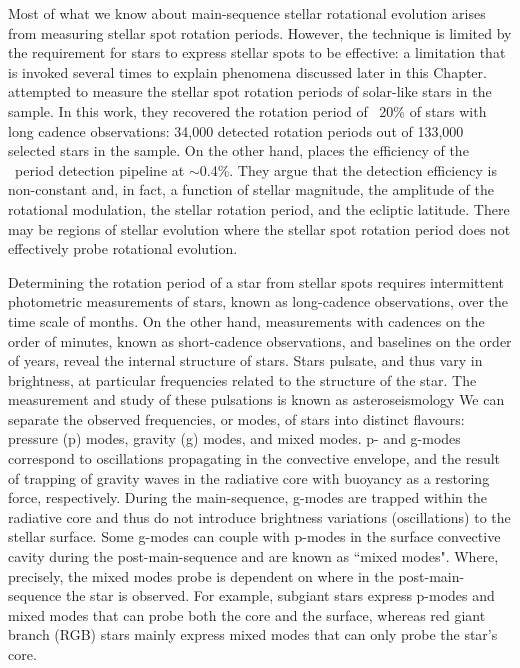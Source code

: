 Most of what we know about main-sequence stellar rotational evolution arises from measuring stellar spot rotation periods.
However, the technique is limited by the requirement for stars to express stellar spots to be effective: a limitation that is invoked several times to explain phenomena discussed later in this Chapter. 
\citet{mcquillan_rotation_2014} attempted to measure the stellar spot rotation periods of solar-like stars in the \kepler{} sample.
In this work, they recovered the rotation period of ~20\% of stars with long cadence observations: 34,000 detected rotation periods out of 133,000 selected stars in the sample.
On the other hand, \citet{distefano_gaia_2022} places the efficiency of the \GDRT\ period detection pipeline at $\sim$0.4\%.
They argue that the detection efficiency is non-constant and, in fact, a function of stellar magnitude, the amplitude of the rotational modulation, the stellar rotation period, and the ecliptic latitude.
There may be regions of stellar evolution where the stellar spot rotation period does not effectively probe rotational evolution.

Determining the rotation period of a star from stellar spots requires intermittent photometric measurements of stars, known as long-cadence observations, over the time scale of months. 
On the other hand, measurements with cadences on the order of minutes, known as short-cadence observations, and baselines on the order of years, reveal the internal structure of stars.
Stars pulsate, and thus vary in brightness, at particular frequencies related to the structure of the star. 
The measurement and study of these pulsations is known as asteroseismology \citep[see, e.g.,][for thorough overviews]{christensen-dalsgaard_interpretation_1982,christensen-dalsgaard_comparison_1990, aerts_asteroseismology_2010, basu_asteroseismic_2017}
We can separate the observed frequencies, or modes, of stars into distinct flavours: pressure (p) modes, gravity (g) modes, and mixed modes.
p- and g-modes correspond to oscillations propagating in the convective envelope, and the result of trapping of gravity waves in the radiative core with buoyancy as a restoring force, respectively. 
During the main-sequence, g-modes are trapped within the radiative core and thus do not introduce brightness variations (oscillations) to the stellar surface.
Some g-modes can couple with p-modes in the surface convective cavity during the post-main-sequence and are known as ``mixed modes".
Where, precisely, the mixed modes probe is dependent on where in the post-main-sequence the star is observed.
For example, subgiant stars express p-modes and mixed modes that can probe both the core and the surface, whereas red giant branch (RGB) stars mainly express mixed modes that can only probe the star's core.

